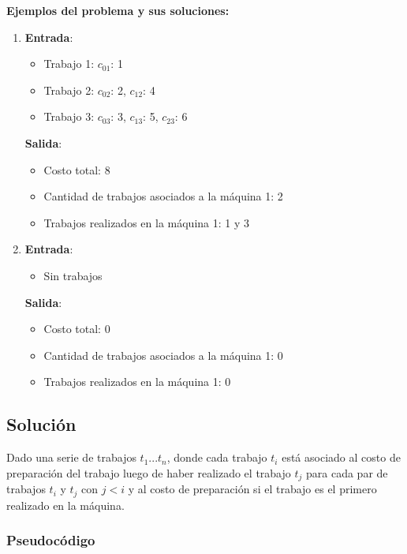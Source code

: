 \documentclass[a4paper, 10pt, twoside]{article}
\begin{document}
\textbf{Ejemplos del problema y sus soluciones:}
\begin{enumerate}
\item{\textbf{Entrada}:}
\begin{itemize}
\item{Trabajo 1: $c_{01}$: 1}
\item{Trabajo 2: $c_{02}$: 2, $c_{12}$: 4}
\item{Trabajo 3: $c_{03}$: 3, $c_{13}$: 5, $c_{23}$: 6}
\end{itemize}
\textbf{Salida}:
\begin{itemize}
\item{Costo total: 8}
\item{Cantidad de trabajos asociados a la máquina 1: 2}
\item{Trabajos realizados en la máquina 1: 1 y 3}
\end{itemize}


\item{\textbf{Entrada}:}
\begin{itemize}
\item{Sin trabajos}
\end{itemize}
\textbf{Salida}:
\begin{itemize}
\item{Costo total: 0}
\item{Cantidad de trabajos asociados a la máquina 1: 0}
\item{Trabajos realizados en la máquina 1: 0}
\end{itemize}
\end{enumerate}

\subsection{Solución}

Dado una serie de trabajos $t_1$...$t_n$, donde cada trabajo $t_i$ está asociado al costo de preparación del trabajo luego de haber realizado el trabajo $t_j$ para cada par de trabajos $t_i$ y $t_j$ con $j<i$ y al costo de preparación si el trabajo es el primero realizado en la máquina.

\subsubsection{Pseudocódigo}
\end{document}
